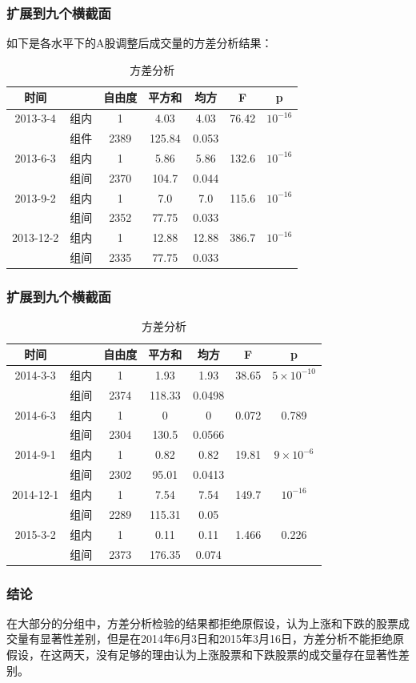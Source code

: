 \documentclass[9pt]{beamer}
\begin{document}
\begin{frame}
\frametitle{扩展到九个横截面}
如下是各水平下的A股调整后成交量的方差分析结果：
\begin{table}[H]
\centering
\caption{方差分析}
\begin{tabular}{ccccccc}
\hline
	  时间   & & 自由度 & 平方和 & 均方 & F & p \\\hline
	2013-3-4& 组内 & 1 & 4.03 & 4.03 & 76.42 & $10^{-16}$ \\
	        & 组件 & 2389 & 125.84 & 0.053 &  & \\\hline
	2013-6-3& 组内 & 1 & 5.86 & 5.86 & 132.6 & $10^{-16}$ \\
          & 组间 & 2370 & 104.7 & 0.044 & &\\\hline
	2013-9-2& 组内 &1 & 7.0 & 7.0 & 115.6 & $10^{-16}$\\
          & 组间 & 2352 & 77.75 & 0.033 & & \\\hline
	2013-12-2& 组内 & 1 & 12.88 & 12.88 & 386.7 & $10^{-16}$ \\
          & 组间 & 2335 & 77.75 & 0.033 & & \\\hline
\end{tabular}
\end{table}
\end{frame}

\begin{frame}
\frametitle{扩展到九个横截面}
\begin{table}[H]
\centering
\caption{方差分析}
\begin{tabular}{ccccccc}
\hline
	  时间   & & 自由度 & 平方和 & 均方 & F & p \\\hline
2014-3-3& 组内 &1 & 1.93 & 1.93 & 38.65 & $5 \times 10^{-10}$\\
	        & 组间 & 2374 & 118.33 & 0.0498 & & \\\hline
	2014-6-3& 组内 & 1 & 0 & 0 & 0.072 & 0.789\\
	        & 组间 & 2304 & 130.5 & 0.0566 & & \\\hline
	2014-9-1& 组内 &1 & 0.82 & 0.82 & 19.81 & $9\times 10^{-6}$\\
	        & 组间 & 2302 & 95.01 & 0.0413 & & \\\hline
	2014-12-1& 组内 & 1 & 7.54 & 7.54 & 149.7 & $10^{-16}$\\
	         & 组间 & 2289 & 115.31 & 0.05 & & \\\hline
	2015-3-2& 组内 & 1 & 0.11 & 0.11 & 1.466 & 0.226\\
	        & 组间 & 2373 & 176.35 & 0.074 & & \\\hline
\end{tabular}
\end{table}
\end{frame}

\begin{frame}
\frametitle{结论}
在大部分的分组中，方差分析检验的结果都拒绝原假设，认为上涨和下跌的股票成交量有显著性差别，但是在2014年6月3日和2015年3月16日，方差分析不能拒绝原假设，在这两天，没有足够的理由认为上涨股票和下跌股票的成交量存在显著性差别。
\end{frame}
\end{document}
